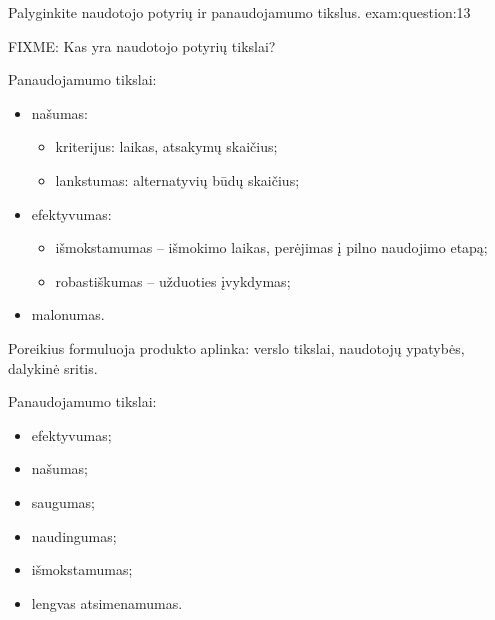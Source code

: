 \begin{question}{%
  Palyginkite naudotojo potyrių ir panaudojamumo tikslus.
  }{exam:question:13}

  FIXME: Kas yra naudotojo potyrių tikslai?

  Panaudojamumo tikslai\cite[20--]{skaidres-5}:
  \begin{itemize}
    \item našumas:
      \begin{itemize}
        \item kriterijus: laikas, atsakymų skaičius;
        \item lankstumas: alternatyvių būdų skaičius;
      \end{itemize}
    \item efektyvumas:
      \begin{itemize}
        \item išmokstamumas – išmokimo laikas, perėjimas į pilno naudojimo
          etapą;
        \item robastiškumas – užduoties įvykdymas;
      \end{itemize}
    \item malonumas.
  \end{itemize}
  Poreikius formuluoja produkto aplinka: verslo tikslai, naudotojų ypatybės,
  dalykinė sritis.

  Panaudojamumo tikslai\cite[47p.]{konspektas}:
  \begin{itemize}
    \item efektyvumas;
    \item našumas;
    \item saugumas;
    \item naudingumas;
    \item išmokstamumas;
    \item lengvas atsimenamumas.
  \end{itemize}
\end{question}

